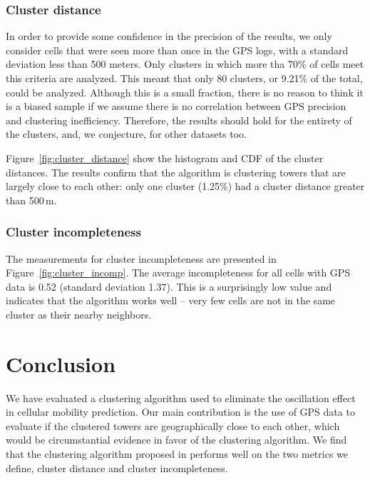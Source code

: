 \documentclass[letterpaper, 12pt, conference]{ieeeconf}
\begin{document}
\subsubsection{Cluster distance}

In order to provide some confidence in the precision of the results, we only 
consider cells that were seen more than once in the GPS logs, with a standard 
deviation less than 500 meters. Only clusters in which more tha 70\% of cells 
meet this criteria are analyzed. This meant that only 80 clusters, or 9.21\% 
of the total, could be analyzed. Although this is a small fraction, there is 
no reason to think it is a biased sample if we assume there is no correlation 
between GPS precision and clustering inefficiency. Therefore, the results 
should hold for the entirety of the clusters, and, we conjecture, for other 
datasets too.

Figure~\ref{fig:cluster_distance} show the histogram and CDF of the cluster 
distances. The results confirm that the algorithm is clustering towers that 
are largely close to each other: only one cluster (1.25\%) had a cluster 
distance greater than 500\,m.

\subsubsection{Cluster incompleteness}

The measurements for cluster incompleteness are presented in
Figure~\ref{fig:cluster_incomp}. The average incompleteness for all cells with GPS data 
is 0.52 (standard deviation 1.37). This is a surprisingly low value and 
indicates that the algorithm works well -- very few cells are not in the same 
cluster as their nearby neighbors.

\section{Conclusion}
\label{sec:conclusion}
We have evaluated a clustering algorithm used to eliminate the oscillation 
effect in cellular mobility prediction. Our main contribution is the use of 
GPS data to evaluate if the clustered towers are geographically close to each 
other, which would be circumstantial evidence in favor of the clustering 
algorithm. We find that the clustering algorithm proposed in \cite{
mobilityprofiler} performs well on the two metrics we define, cluster 
distance and cluster incompleteness.
\end{document}
